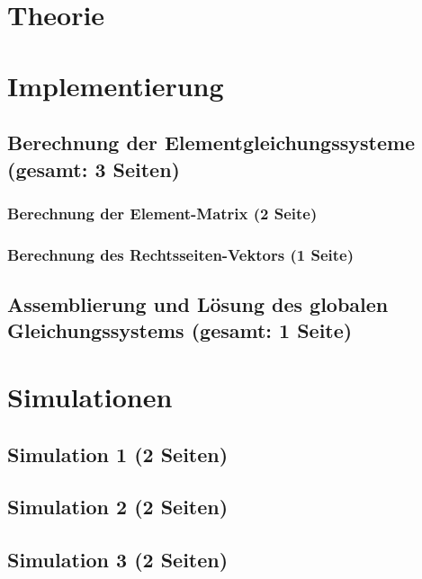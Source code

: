 \documentclass[12pt,a4paper]{scrartcl}
\begin{document}




%


\section{Theorie}








\section{Implementierung}





\subsection{Berechnung der Elementgleichungssysteme (gesamt: 3 Seiten)}
\label{sec:equation_system_calculation}
\subsubsection{Berechnung der Element-Matrix (2 Seite)}
\subsubsection{Berechnung des Rechtsseiten-Vektors (1 Seite)}

\subsection{Assemblierung und Lösung des globalen Gleichungssystems (gesamt: 1 Seite)}
\label{sec:assembling}

\section{Simulationen}
\subsection{Simulation 1 (2 Seiten)}
\subsection{Simulation 2 (2 Seiten)}
\subsection{Simulation 3 (2 Seiten)}


\newpage
{}

\end{document}
